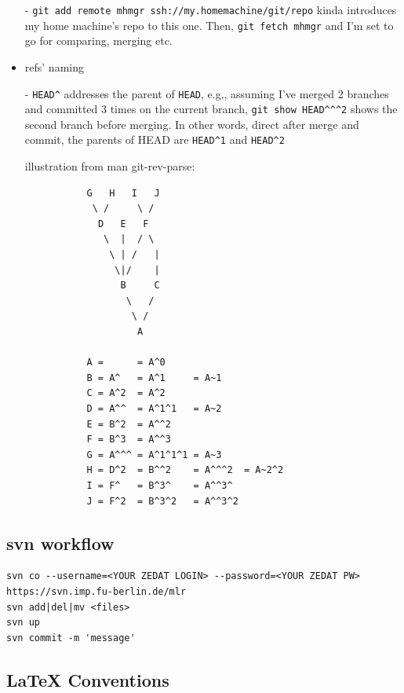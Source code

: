 \begin{itemize}
- \verb`git add remote mhmgr ssh://my.homemachine/git/repo` kinda introduces
  my home machine's repo to this one. Then, \verb`git fetch mhmgr` and I'm
  set to go for comparing, merging etc.

\item{refs' naming}

- \verb`HEAD^` addresses the parent of \verb`HEAD`, e.g., assuming I've
  merged 2 branches and committed 3 times on the current branch, 
  \verb`git show HEAD^^^2` shows the second branch before merging. In
  other words, direct after merge and commit, the parents of HEAD are
  \verb`HEAD^1`  and \verb`HEAD^2`  
   
   illustration from man git-rev-parse:
   
   \begin{code} \begin{verbatim}
           G   H   I   J
            \ /     \ /
             D   E   F
              \  |  / \
               \ | /   |
                \|/    |
                 B     C
                  \   /
                   \ /
                    A

           A =      = A^0
           B = A^   = A^1     = A~1
           C = A^2  = A^2
           D = A^^  = A^1^1   = A~2
           E = B^2  = A^^2
           F = B^3  = A^^3
           G = A^^^ = A^1^1^1 = A~3
           H = D^2  = B^^2    = A^^^2  = A~2^2
           I = F^   = B^3^    = A^^3^
           J = F^2  = B^3^2   = A^^3^2

\end{verbatim} \end{code}

\end{itemize}

\subsection{svn workflow}

\begin{code}
\begin{verbatim}
svn co --username=<YOUR ZEDAT LOGIN> --password=<YOUR ZEDAT PW> https://svn.imp.fu-berlin.de/mlr
svn add|del|mv <files>
svn up
svn commit -m 'message'
\end{verbatim}
\end{code}



\subsection{LaTeX Conventions}

